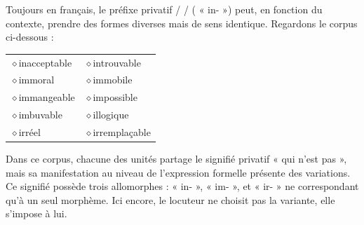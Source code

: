 Toujours en français, le préfixe privatif /  / ( « in- ») peut, en fonction du contexte, prendre des formes diverses mais de sens identique. Regardons le corpus ci-dessous :
\begin{center}\begin{tabular}{ll}
$\diamond$\quad inacceptable & $\diamond$\quad introuvable\\
$\diamond$\quad immoral & $\diamond$\quad immobile\\
$\diamond$\quad immangeable & $\diamond$\quad impossible\\
$\diamond$\quad imbuvable & $\diamond$\quad illogique\\
$\diamond$\quad irréel & $\diamond$\quad irremplaçable
\end{tabular}\end{center}
Dans ce corpus, chacune des unités partage le signifié privatif « qui n’est pas », mais sa manifestation au niveau de l’expression formelle présente des variations. Ce signifié possède trois allomorphes : « in- », « im- », et « ir- » ne correspondant qu’à un seul morphème. Ici encore, le locuteur ne choisit pas la variante, elle s’impose à lui.

